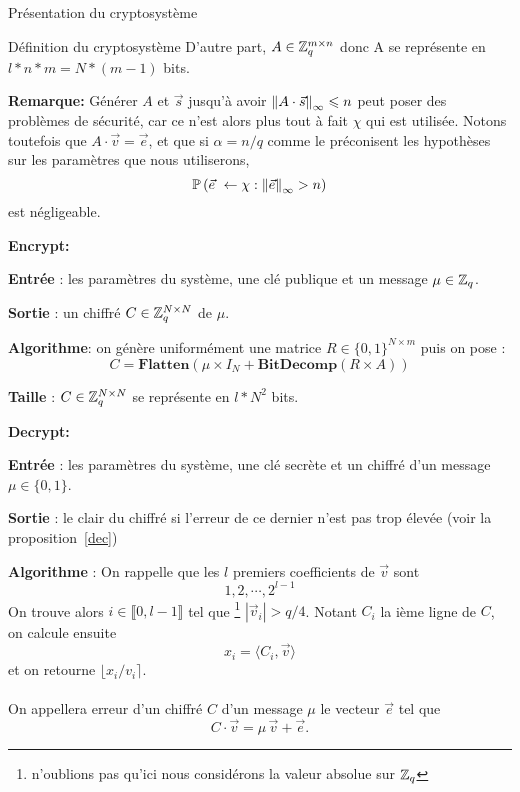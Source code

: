 \begin{section}{Présentation du cryptosystème}
\begin{subsection}{Définition du cryptosystème}
	D'autre part, $A \in \mathbb{Z}_q^{m \times n}$ donc A se représente en $l * n * m =	N * (m - 1)$ bits.

	\textbf{Remarque:} Générer $A$ et $\vec{s}$ jusqu'à avoir ${\|A \cdot \vec{s}\|}_{\infty} \leqslant n$ peut poser des problèmes de sécurité, car ce n'est alors plus tout à fait $\chi$ qui est utilisée. Notons toutefois que $A \cdot \vec{v} = \vec{e}$, et que si $\alpha = n/q$ comme le préconisent les hypothèses sur les paramètres que nous utiliserons,
	\[ \PP\left(\vec{e} \leftarrow \chi: \norm{\vec{e}} > n\right) \]
	est négligeable.

\vspace{0.5cm}\noindent\textbf{Encrypt:}
\flushleft
	
	\textbf{Entrée} : les paramètres du système, une clé publique et un message $\mu \in \mathbb{Z}_q$.

	\textbf{Sortie} : un chiffré $C \in \mathbb{Z}_q^{N \times N}$ de $\mu$.

	\textbf{Algorithme}: on génère uniformément une matrice $R \in \{ 0,1\} ^{N \times m}$ puis on pose :
	\[C = \textbf{Flatten}(\mu \times I_N + \textbf{BitDecomp}(R \times A))\]

	\textbf{Taille} : $C \in \mathbb{Z}_q^{N \times N}$ se représente en $l * N^2$ bits.
	
\vspace{0.5cm}\noindent\textbf{Decrypt:}
\flushleft
	
	\textbf{Entrée} : les paramètres du système, une clé secrète et un chiffré d'un message $\mu \in \{ 0,1\}$.

	\textbf{Sortie} : le clair du chiffré si l'erreur de ce dernier n'est pas trop élevée (voir la proposition~\ref{dec})

	\textbf{Algorithme} : On rappelle que les $l$ premiers coefficients de $\vec{v}$ sont 
	\[1, 2, \cdots, 2^{l-1} \]
	On trouve alors $i\in\llbracket 0, l-1\rrbracket$ tel que
	\footnote{n'oublions pas qu'ici nous considérons la valeur absolue sur $\mathbb{Z}_q$} 
	$|\vec{v}_i| > q/4$. Notant $C_i$ la ième ligne de $C$, on calcule ensuite 
	\[ x_i = \langle C_i, \vec{v} \rangle \] et on retourne $\lfloor x_i/v_i \rceil$.


\paragraph{}
\begin{definition}
On appellera erreur d'un chiffré $C$ d'un message $\mu$ le vecteur $\vec{e}$ tel que
\[ C\cdot \vec{v} = \mu\, \vec{v} + \vec{e}. \]
\end{definition}


\end{subsection}
\end{section}
